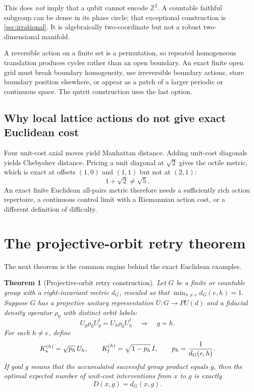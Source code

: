 \documentclass[11pt]{article}
\newtheorem{theorem}{Theorem}[section]
\theoremstyle{definition}
\theoremstyle{remark}
\newcommand{\Z}{\mathbb Z}
\begin{document}
This does \emph{not} imply that a qubit cannot encode $\Z^2$. A countable
faithful subgroup can be dense in its phase circle; that exceptional
construction is \cref{sec:irrational}. It is algebraically two-coordinate but
not a robust two-dimensional manifold.

A reversible action on a finite set is a permutation, so repeated homogeneous
translation produces cycles rather than an open boundary. An exact finite open
grid must break boundary homogeneity, use irreversible boundary actions, store
boundary position elsewhere, or appear as a patch of a larger periodic or
continuous space. The qutrit construction uses the last option.

\subsection{Why local lattice actions do not give exact Euclidean cost}

Four unit-cost axial moves yield Manhattan distance. Adding unit-cost
diagonals yields Chebyshev distance. Pricing a unit diagonal at $\sqrt2$
gives the octile metric, which is exact at offsets $(1,0)$ and $(1,1)$ but not
at $(2,1)$:
\begin{equation}
  1+\sqrt2\ne\sqrt5.
\end{equation}
An exact finite Euclidean all-pairs metric therefore needs a sufficiently rich
action repertoire, a continuous control limit with a Riemannian action cost,
or a different definition of difficulty.

\section{The projective-orbit retry theorem}
\label{sec:retry}

The next theorem is the common engine behind the exact Euclidean examples.

\begin{theorem}[Projective-orbit retry construction]
\label{thm:retry}
Let $G$ be a finite or countable group with a right-invariant metric $d_G$,
rescaled so that
$\min_{h\ne e}d_G(e,h)=1$. Suppose $G$ has a projective unitary
representation $U:G\to PU(d)$ and a fiducial density operator $\rho_0$ with
distinct orbit labels:
\begin{equation}
 U_g\rho_0U_g^\dagger=U_h\rho_0U_h^\dagger
 \quad\Longrightarrow\quad g=h.
 \label{eq:distinct-orbit}
\end{equation}
For each $h\ne e$, define
\begin{equation}
 K_{\rm s}^{(h)}=\sqrt{p_h}\,U_h,\qquad
 K_{\rm f}^{(h)}=\sqrt{1-p_h}\,I,\qquad
 p_h=\frac1{d_G(e,h)}.
 \label{eq:retry-instrument}
\end{equation}
If goal $g$ means that the accumulated successful group product equals $g$,
then the optimal expected number of unit-cost interventions from $x$ to $g$
is exactly
\begin{equation}
  D(x,g)=d_G(x,g).
  \label{eq:retry-result}
\end{equation}
\end{theorem}
\end{document}
